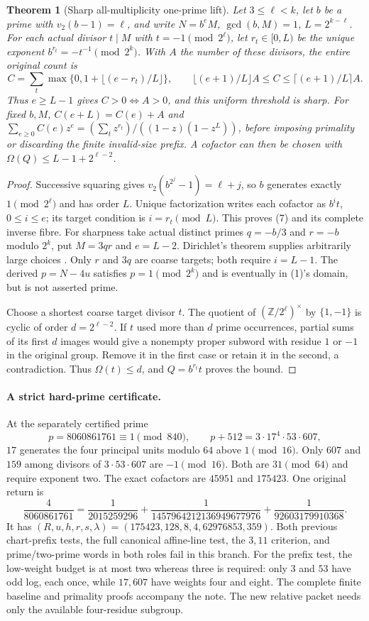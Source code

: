 \documentclass[10pt,a4paper]{article}
\newtheorem{theorem}{Theorem}
\begin{document}
\begin{theorem}[Sharp all-multiplicity one-prime lift]
Let $3\le\ell<k$, let $b$ be a prime with $v_2(b-1)=\ell$, and write
$N=b^eM$, $\gcd(b,M)=1$, $L=2^{k-\ell}$. For each actual divisor
$t\mid M$ with $t=-1\pmod{2^\ell}$, let $r_t\in[0,L)$ be the unique exponent
$b^{r_t}=-t^{-1}\pmod{2^k}$. With $A$ the number of these divisors, the entire
original count is
\[
 C=\sum_t\max\{0,1+\lfloor(e-r_t)/L\rfloor\},\qquad
 \lfloor(e+1)/L\rfloor A\le C\le\lceil(e+1)/L\rceil A.      \tag{7}
\]
Thus $e\ge L-1$ gives $C>0\iff A>0$, and this uniform threshold is sharp.
For fixed $b,M$, $C(e+L)=C(e)+A$ and
$\sum_{e\ge0}C(e)z^e=(\sum_t z^{r_t})/((1-z)(1-z^L))$, before imposing primality
or discarding the finite invalid-size prefix.
A cofactor can then be chosen with $\Omega(Q)\le L-1+2^{\ell-2}$.
\end{theorem}
\begin{proof}
Successive squaring gives $v_2(b^{2^j}-1)=\ell+j$, so $b$ generates exactly
$1\pmod{2^\ell}$ and has order $L$. Unique factorization writes each cofactor
as $b^it$, $0\le i\le e$; its target condition is $i=r_t\pmod L$.
This proves (7) and its complete inverse fibre.
For sharpness take actual distinct primes $q=-b/3$ and $r=-b$ modulo $2^k$,
put $M=3qr$ and $e=L-2$. Dirichlet's theorem supplies arbitrarily large choices
\cite[Theorem 18.1]{Dirichlet}. Only $r$ and $3q$ are coarse targets; both require
$i=L-1$. The derived $p=N-4u$ satisfies $p=1\pmod{2^k}$ and is eventually in
(1)'s domain, but is not asserted prime.

Choose a shortest coarse target divisor $t$. The quotient of
$(\mathbb Z/2^\ell)^\times$ by $\{1,-1\}$ is cyclic of order $d=2^{\ell-2}$.
If $t$ used more than $d$ prime occurrences, partial sums of its first $d$
images would give a nonempty proper subword with residue $1$ or $-1$ in the
original group. Remove it in the first case or retain it in the second, a
contradiction. Thus $\Omega(t)\le d$, and $Q=b^{r_t}t$ proves the bound.
\end{proof}

\paragraph{A strict hard-prime certificate.}
At the separately certified prime
\[
 p=8060861761\equiv1\pmod{840},\qquad
 p+512=3\cdot17^4\cdot53\cdot607,
\]
$17$ generates the four principal units modulo $64$ above $1\pmod{16}$.
Only $607$ and $159$ among divisors of $3\cdot53\cdot607$ are $-1\pmod{16}$.
Both are $31\pmod{64}$ and require exponent two. The exact cofactors are
$45951$ and $175423$. One original return is
\[
 \boxed{\frac4{8060861761}=\frac1{2015259296}
 +\frac1{1457964212136949677976}+\frac1{92603179910368}.}
\]
It has $(R,u,h,r,s,\lambda)=(175423,128,8,4,62976853,359)$.
Both previous chart-prefix tests, the full canonical affine-line test, the
$3,11$ criterion, and prime/two-prime words in both roles fail in this branch.
For the prefix test, the low-weight budget is at most two whereas three is
required: only $3$ and $53$ have odd log, each once, while $17,607$ have weights
four and eight. The complete finite baseline and primality proofs accompany
the note. The new relative packet needs only the available four-residue subgroup.
\end{document}
